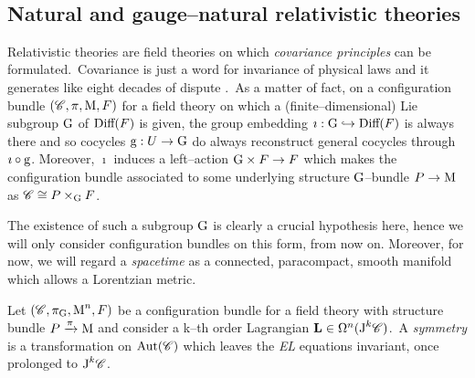 
\,\newline

\subsection{Natural and gauge--natural relativistic theories}\label{gauge_theories}

Relativistic theories are field theories on which \emph{covariance principles} can be formulated.\, Covariance is just a word for invariance of physical laws and it generates like eight decades of dispute \cite{fatib}.\, As a matter of fact, on a configuration bundle $(\mathscr{C},\pi,\text{\normalfont M},F)$ for a field theory on which a (finite--dimensional) Lie subgroup $\text{\normalfont G}$ of $\text{\normalfont Diff}(F)$ is given, the group embedding $\imath:\text{\normalfont G}\hookrightarrow\text{\normalfont Diff}(F)$ is always there and so cocycles $\text{\normalfont g}:U\to\text{\normalfont G}$ do always reconstruct general cocycles through $\imath\circ\text{\normalfont g}$. Moreover, $\imath$ induces a left--action $\text{\normalfont G}\times F\to F$ which makes the configuration bundle associated to some underlying structure $\text{\normalfont G}$--bundle $P\to\text{\normalfont M}$ as $\mathscr{C}\cong P\times_{\text{\normalfont G}} F$. 

The existence of such a subgroup $\text{\normalfont G}$ is clearly a crucial hypothesis here, hence we will only consider configuration bundles on this form, from now on. Moreover, for now, we will regard a \emph{spacetime} as a connected, paracompact, smooth manifold which allows a Lorentzian metric.

\begin{defi}[Symmetry]
    Let $(\mathscr{C},\pi_{\text{\normalfont G}},\text{\normalfont M}^n,F)$ be a configuration bundle for a field theory with structure bundle $P\xrightarrow{\pi}\text{\normalfont M}$ and consider a k--th order Lagrangian $\mathbf{L}\in\Omega^n(\text{\normalfont J}^k\mathscr{C})$.\, A \emph{symmetry} is a transformation on $\text{\normalfont Aut}(\mathscr{C})$ which leaves the \emph{EL} equations invariant, once prolonged to $\text{\normalfont J}^k\mathscr{C}$. %
    
\end{defi}

